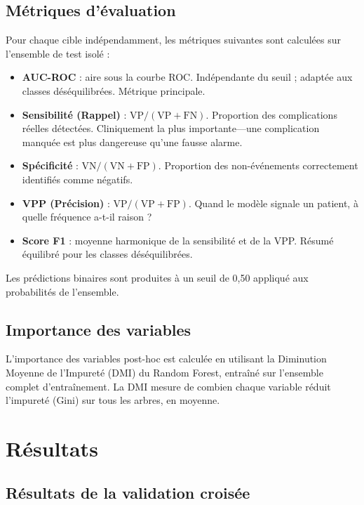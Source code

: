 \documentclass[12pt,a4paper]{report}
\begin{document}
\section{Métriques d'évaluation}

Pour chaque cible indépendamment, les métriques suivantes sont calculées sur l'ensemble de test isolé :
\begin{itemize}
  \item \textbf{AUC-ROC} : aire sous la courbe ROC. Indépendante du seuil ; adaptée aux classes déséquilibrées. Métrique principale.
  \item \textbf{Sensibilité (Rappel)} : $\text{VP} / (\text{VP} + \text{FN})$. Proportion des complications réelles détectées. Cliniquement la plus importante---une complication manquée est plus dangereuse qu'une fausse alarme.
  \item \textbf{Spécificité} : $\text{VN} / (\text{VN} + \text{FP})$. Proportion des non-événements correctement identifiés comme négatifs.
  \item \textbf{VPP (Précision)} : $\text{VP} / (\text{VP} + \text{FP})$. Quand le modèle signale un patient, à quelle fréquence a-t-il raison ?
  \item \textbf{Score F1} : moyenne harmonique de la sensibilité et de la VPP. Résumé équilibré pour les classes déséquilibrées.
\end{itemize}
Les prédictions binaires sont produites à un seuil de 0,50 appliqué aux probabilités de l'ensemble.

\section{Importance des variables}

L'importance des variables post-hoc est calculée en utilisant la Diminution Moyenne de l'Impureté (DMI) du Random Forest, entraîné sur l'ensemble complet d'entraînement. La DMI mesure de combien chaque variable réduit l'impureté (Gini) sur tous les arbres, en moyenne.

\chapter{Résultats}
\label{chap:results}

\section{Résultats de la validation croisée}
\end{document}
